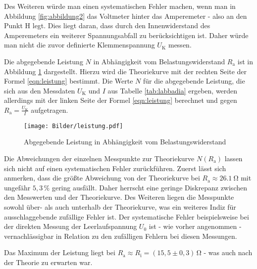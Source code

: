 Des Weiteren würde man einen systematischen Fehler machen, wenn man in Abbildung \ref{fig:abbildung2} das Voltmeter hinter das Amperemeter - also an den Punkt H legt.
Dies liegt daran, dass durch den Innenwiderstand des Amperemeters ein weiterer Spannungsabfall zu berücksichtigen ist. Daher würde man nicht die zuvor definierte Klemmenspannung $U_{\text{K}}$ messen.

Die abgegebende Leistung $N$ in Abhängigkeit vom Belastungswiderstand $R_{\text{a}}$ ist in Abbildung \ref{fig:aufe} dargestellt.
Hierzu wird die Theoriekurve mit der rechten Seite der Formel \eqref{eqn:leistung} bestimmt.
Die Werte $N$ für die abgegebende Leistung, die sich aus den Messdaten $U_{\text{K}}$ und $I$ aus Tabelle \ref{tab:labbadia} ergeben, werden allerdings mit der linken Seite der Formel \eqref{eqn:leistung} berechnet und gegen $R_{\text{a}} = \frac{U_{\text{K}}}{I}$ aufgetragen.

\begin{figure}
\texttt{[image: Bilder/leistung.pdf]}
\caption{Abgegebende Leistung in Abhängigkeit vom Belastungswiderstand}
\label{fig:aufe}
\end{figure}

Die Abweichungen der einzelnen Messpunkte zur Theoriekurve $N(R_{\text{a}})$ lassen sich nicht auf einen systematischen Fehler zurückführen.
Zuerst lässt sich anmerken, dass die größte Abweichung von der Theoriekurve bei $R_{\text{a}} \approx \SI{26,1}{\ohm}$ mit ungefähr $5,3 \, \%$ gering ausfällt. Daher herrscht eine geringe Diskrepanz zwischen den Messwerten und der Theoriekurve.
Des Weiteren liegen die Messpunkte sowohl über- als auch unterhalb der Theoriekurve, was ein weiteres Indiz für ausschlaggebende zufällige Fehler ist.
Der systematische Fehler beispielsweise bei der direkten Messung der Leerlaufspannung $U_0$ ist - wie vorher angenommen - vernachlässigbar in Relation zu den zufälligen Fehlern bei diesen Messungen.

Das Maximum der Leistung liegt bei $R_{\text{a}} \approx R_{\text{i}} = (15,5 \pm 0,3) \, \si{\ohm}$ - was auch nach der Theorie zu erwarten war.
